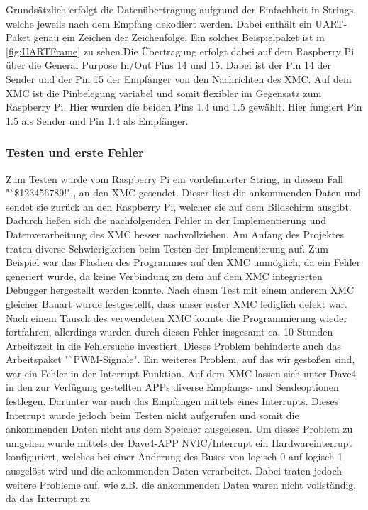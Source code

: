 \documentclass[12pt,a4paper,bibliography=totoc,listof=totoc]{scrartcl}
\begin{document}
Grundsätzlich erfolgt die Datenübertragung aufgrund der Einfachheit in Strings, welche jeweils nach dem 
Empfang dekodiert werden. Dabei enthält ein UART-Paket genau ein Zeichen der Zeichenfolge. Ein solches 
Beispielpaket ist in \ref{fig:UARTFrame} zu sehen.Die Übertragung erfolgt dabei auf dem Raspberry Pi über 
die General Purpose In/Out Pins 14 und 15. Dabei ist der Pin 14 der Sender und der Pin 15 der Empfänger 
von den Nachrichten des XMC. Auf dem XMC ist die Pinbelegung variabel und somit flexibler im Gegensatz 
zum Raspberry Pi. Hier wurden die beiden Pins 1.4 und 1.5 gewählt. Hier fungiert Pin 1.5 als Sender und 
Pin 1.4 als Empfänger.
\subsubsection {Testen und erste Fehler}
Zum Testen wurde vom Raspberry Pi ein vordefinierter String, in diesem Fall 
"`\$123456789!",, an den XMC gesendet. Dieser liest die ankommenden Daten und sendet sie zurück an den 
Raspberry Pi, welcher sie auf dem Bildschirm ausgibt. Dadurch ließen sich die nachfolgenden Fehler in 
der Implementierung und Datenverarbeitung des XMC besser nachvollziehen. Am Anfang des Projektes traten diverse Schwierigkeiten 
beim Testen der Implementierung auf. Zum Beispiel war das Flashen des Programmes auf den XMC unmöglich, 
da ein Fehler generiert wurde, da keine Verbindung zu dem auf dem XMC integrierten Debugger hergestellt 
werden konnte. Nach einem Test mit einem anderem XMC gleicher Bauart wurde festgestellt, dass unser erster 
XMC lediglich defekt war. Nach einem Tausch des verwendeten XMC konnte die Programmierung wieder 
fortfahren, allerdings wurden durch diesen Fehler insgesamt ca. 10 Stunden Arbeitszeit in die Fehlersuche 
investiert. Dieses Problem behinderte auch das Arbeitspaket "`PWM-Signale".
Ein weiteres Problem, auf das wir gestoßen sind, war ein Fehler in der Interrupt-Funktion. Auf dem XMC 
lassen sich unter Dave4 in den zur Verfügung gestellten APPs diverse Empfangs- und Sendeoptionen festlegen. 
Darunter war auch das Empfangen mittels eines Interrupts. Dieses Interrupt wurde jedoch beim Testen nicht 
aufgerufen und somit die ankommenden Daten nicht aus dem Speicher ausgelesen. Um dieses Problem zu umgehen 
wurde mittels der Dave4-APP NVIC/Interrupt ein Hardwareinterrupt konfiguriert, welches bei einer Änderung 
des Buses von logisch 0 auf logisch 1 ausgelöst wird und die ankommenden Daten verarbeitet. Dabei traten 
jedoch weitere Probleme auf, wie z.B. die ankommenden Daten waren nicht vollständig, da das Interrupt zu 
\end{document}
